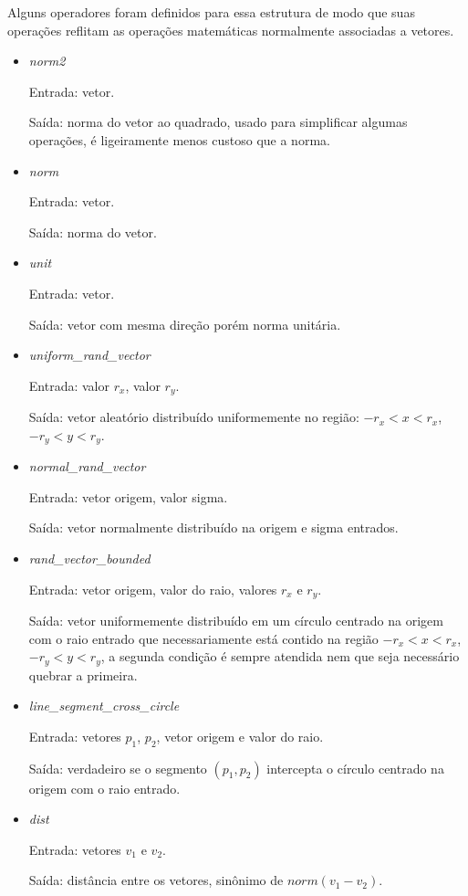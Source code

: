 Alguns operadores foram definidos para essa estrutura de modo que suas operações
reflitam as operações matemáticas normalmente associadas a vetores.

\begin{itemize}
  \item \textit{norm2}
    \par Entrada: vetor.
    \par Saída: norma do vetor ao quadrado, usado para simplificar algumas
    operações, é ligeiramente menos custoso que a norma.
  \item \textit{norm}
    \par Entrada: vetor.
    \par Saída: norma do vetor.
  \item \textit{unit}
    \par Entrada: vetor.
    \par Saída: vetor com mesma direção porém norma unitária.
  \item \textit{uniform_rand_vector}
    \par Entrada: valor $r_x$, valor $r_y$.
    \par Saída: vetor aleatório distribuído uniformemente no região:
    $-r_x < x < r_x$, $-r_y < y < r_y$.
  \item \textit{normal_rand_vector}
    \par Entrada: vetor origem, valor sigma.
    \par Saída: vetor normalmente distribuído na origem e sigma entrados.
  \item \textit{rand_vector_bounded}
    \par Entrada: vetor origem, valor do raio, valores $r_x$ e $r_y$.
    \par Saída: vetor uniformemente distribuído em um círculo centrado na origem
    com o raio entrado que necessariamente está contido na região
    $-r_x < x < r_x$, $-r_y < y < r_y$, a segunda condição é sempre atendida nem
    que seja necessário quebrar a primeira.
  \item \textit{line_segment_cross_circle}
    \par Entrada: vetores $p_1$, $p_2$, vetor origem e valor do raio.
    \par Saída: verdadeiro se o segmento $(p_1, p_2)$ intercepta o círculo
    centrado na origem com o raio entrado.
  \item \textit{dist}
    \par Entrada: vetores $v_1$ e $v_2$.
    \par Saída: distância entre os vetores, sinônimo de $norm(v_1 - v_2)$.
\end{itemize}


